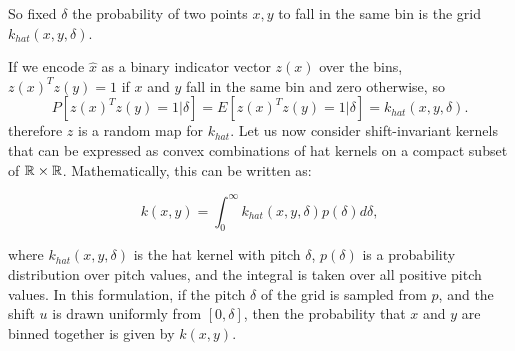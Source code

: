 So fixed $\delta$ the probability of two points $x,y$  to fall in the same bin is the grid $k_{hat}(x,y,\delta)$. 

If we encode $\hat{x}$ as a binary indicator vector $z(x)$ over the bins, 
$z(x)^T z(y) = 1$ if $x$ and $y$ fall in the same bin and zero otherwise, so 
\begin{equation}
    P\left[
        z(x)^T z(y) = 1 | \delta
    \right]
    = 
    E\left[
        z(x)^T z(y) = 1 | \delta
    \right]
    = 
    k_{hat}(x,y,\delta). 
\end{equation}
therefore $z$ is a random map for $k_{hat}$. 
Let us now consider shift-invariant kernels that can be expressed as convex combinations of hat kernels on a compact subset of $\mathbb{R} \times \mathbb{R}$. Mathematically, this can be written as:

\begin{equation}
k(x,y) = \int_{0}^\infty k_{hat}(x,y,\delta) p(\delta) d\delta,
\end{equation}

where $k_{hat}(x,y,\delta)$ is the hat kernel with pitch $\delta$, $p(\delta)$ is a probability distribution over pitch values, and the integral is taken over all positive pitch values. In this formulation, if the pitch $\delta$ of the grid is sampled from $p$, and the shift $u$ is drawn uniformly from $[0,\delta]$, then the probability that $x$ and $y$ are binned together is given by $k(x,y)$.

